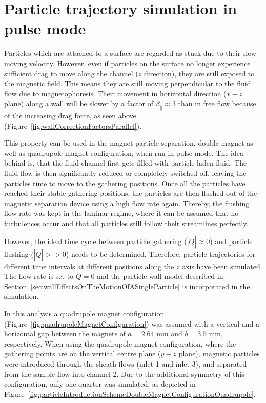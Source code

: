\section{Particle trajectory simulation in pulse mode}
\label{sec:pulseModeParticleSeparationSimulation}
Particles which are attached to a surface are regarded as stuck due to their slow moving velocity. However, even if particles on the surface no longer experience sufficient drag to move along the channel ($z$ direction), they are still exposed to the magnetic field. This means they are still moving perpendicular to the fluid flow due to magnetophoresis. Their movement in horizontal direction ($x-z$ plane) along a wall will be slower by a factor of $\beta_{\parallel} \approx 3$ than in free flow because of the increasing drag force, as seen above (Figure~\ref{fig:wallCorrectionFactorsParallel}). 

This property can be used in the magnet particle separation, double magnet as well as quadrupole magnet configuration, when run in pulse mode. The idea behind is, that the fluid channel first gets filled with particle laden fluid. The fluid flow is then significantly reduced or completely switched off, leaving the particles time to move to the gathering positions. Once all the particles have reached their stable gathering positions, the particles are then flushed out of the magnetic separation device using a high flow rate again. Thereby, the flushing flow rate was kept in the laminar regime, where it can be assumed that no turbulences occur and that all particles still follow their streamlines perfectly.

However, the ideal time cycle between particle gathering ($|\dot{Q}| \approx 0$) and particle flushing ($|\dot{Q}| >> 0$) needs to be determined. Therefore, particle trajectories for different time intervals at different positions along the $z$ axis have been simulated. The flow rate is set to $\dot{Q}=0$ and the particle-wall model described in Section~\ref{sec:wallEffectsOnTheMotionOfASingleParticle} is incorporated in the simulation. 

In this analysis a quadrupole magnet configuration (Figure~\ref{fig:quadrupoleMagnetConfiguration}) was assumed with a vertical and a horizontal gap between the magnets of $a=2.64$ mm and $b=3.5$ mm, respectively. When using the quadrupole magnet configuration, where the gathering points are on the vertical centre plane ($y-z$ plane), magnetic particles were introduced through the sheath flows (inlet 1 and inlet 3), and separated from the sample flow into channel 2. Due to the additional symmetry of this configuration, only one quarter was simulated, as depicted in Figure~\ref{fig:particleIntroductionSchemeDoubleMagnetConfigurationQuadrupole}. 

